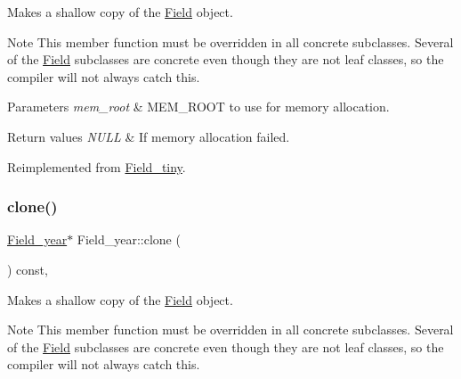Makes a shallow copy of the \mbox{\hyperlink{classField}{Field}} object.

\begin{DoxyNote}{Note}
This member function must be overridden in all concrete subclasses. Several of the \mbox{\hyperlink{classField}{Field}} subclasses are concrete even though they are not leaf classes, so the compiler will not always catch this.
\end{DoxyNote}

\begin{DoxyParams}{Parameters}
{\em mem\+\_\+root} & M\+E\+M\+\_\+\+R\+O\+OT to use for memory allocation. \\
\hline
\end{DoxyParams}

\begin{DoxyRetVals}{Return values}
{\em N\+U\+LL} & If memory allocation failed. \\
\hline
\end{DoxyRetVals}


Reimplemented from \mbox{\hyperlink{classField__tiny_acbaf0f92950a7291a622f8c99b40adc9}{Field\+\_\+tiny}}.

\mbox{\label{classField__year_a6c270a994f22f6c4979091d31a453942}} 
\subsubsection{\texorpdfstring{clone()}{clone()}\hspace{0.1cm}{\footnotesize\ttfamily [2/2]}}
{\footnotesize\ttfamily \mbox{\hyperlink{classField__year}{Field\+\_\+year}}$\ast$ Field\+\_\+year\+::clone (\begin{DoxyParamCaption}{ }\end{DoxyParamCaption}) const\hspace{0.3cm}{\ttfamily [inline]}, {\ttfamily [virtual]}}

Makes a shallow copy of the \mbox{\hyperlink{classField}{Field}} object.

\begin{DoxyNote}{Note}
This member function must be overridden in all concrete subclasses. Several of the \mbox{\hyperlink{classField}{Field}} subclasses are concrete even though they are not leaf classes, so the compiler will not always catch this.
\end{DoxyNote}

